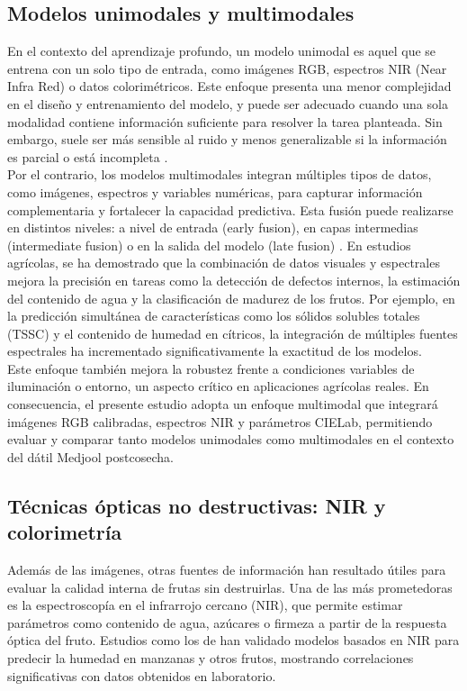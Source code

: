 \subsection{Modelos unimodales y multimodales}

En el contexto del aprendizaje profundo, un modelo unimodal es aquel que se entrena con un solo tipo de entrada, como imágenes RGB, espectros NIR (Near Infra Red) o datos colorimétricos. Este enfoque presenta una menor complejidad en el diseño y entrenamiento del modelo, y puede ser adecuado cuando una sola modalidad contiene información suficiente para resolver la tarea planteada. Sin embargo, suele ser más sensible al ruido y menos generalizable si la información es parcial o está incompleta \parencite{kamilaris_deep_2018}.\\

Por el contrario, los modelos multimodales integran múltiples tipos de datos, como imágenes, espectros y variables numéricas, para capturar información complementaria y fortalecer la capacidad predictiva. Esta fusión puede realizarse en distintos niveles: a nivel de entrada (early fusion), en capas intermedias (intermediate fusion) o en la salida del modelo (late fusion) \parencite{passos_deep_2023}. En estudios agrícolas, se ha demostrado que la combinación de datos visuales y espectrales mejora la precisión en tareas como la detección de defectos internos, la estimación del contenido de agua y la clasificación de madurez de los frutos. Por ejemplo, en la predicción simultánea de características como los sólidos solubles totales (TSSC) y el contenido de humedad en cítricos, la integración de múltiples fuentes espectrales ha incrementado significativamente la exactitud de los modelos.\\

Este enfoque también mejora la robustez frente a condiciones variables de iluminación o entorno, un aspecto crítico en aplicaciones agrícolas reales. En consecuencia, el presente estudio adopta un enfoque multimodal que integrará imágenes RGB calibradas, espectros NIR y parámetros CIELab, permitiendo evaluar y comparar tanto modelos unimodales como multimodales en el contexto del dátil Medjool postcosecha.

\subsection{Técnicas ópticas no destructivas: NIR y colorimetría}

Además de las imágenes, otras fuentes de información han resultado útiles para evaluar la calidad interna de frutas sin destruirlas. Una de las más prometedoras es la espectroscopía en el infrarrojo cercano (NIR), que permite estimar parámetros como contenido de agua, azúcares o firmeza a partir de la respuesta óptica del fruto. Estudios como los de \parencite{chen_prediction_2024, wang_improving_2025} han validado modelos basados en NIR para predecir la humedad en manzanas y otros frutos, mostrando correlaciones significativas con datos obtenidos en laboratorio.\\

